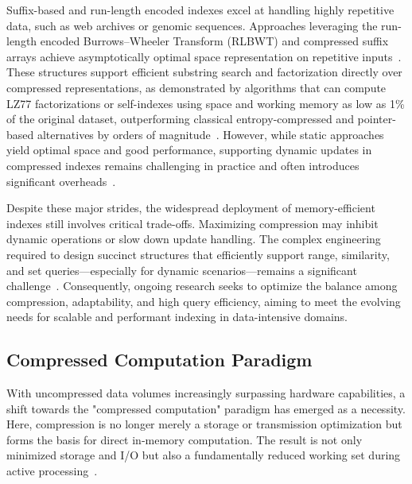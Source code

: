 \documentclass[sigconf]{acmart}
\begin{document}
Suffix-based and run-length encoded indexes excel at handling highly repetitive data, such as web archives or genomic sequences. Approaches leveraging the run-length encoded Burrows–Wheeler Transform (RLBWT) and compressed suffix arrays achieve asymptotically optimal space representation on repetitive inputs~\cite{ref80}. These structures support efficient substring search and factorization directly over compressed representations, as demonstrated by algorithms that can compute LZ77 factorizations or self-indexes using space and working memory as low as 1\% of the original dataset, outperforming classical entropy-compressed and pointer-based alternatives by orders of magnitude~\cite{ref80,ref81}. However, while static approaches yield optimal space and good performance, supporting dynamic updates in compressed indexes remains challenging in practice and often introduces significant overheads~\cite{ref80,ref108,ref118}.

Despite these major strides, the widespread deployment of memory-efficient indexes still involves critical trade-offs. Maximizing compression may inhibit dynamic operations or slow down update handling. The complex engineering required to design succinct structures that efficiently support range, similarity, and set queries—especially for dynamic scenarios—remains a significant challenge~\cite{ref109,ref118}. Consequently, ongoing research seeks to optimize the balance among compression, adaptability, and high query efficiency, aiming to meet the evolving needs for scalable and performant indexing in data-intensive domains.

\subsection{Compressed Computation Paradigm}

With uncompressed data volumes increasingly surpassing hardware capabilities, a shift towards the "compressed computation" paradigm has emerged as a necessity. Here, compression is no longer merely a storage or transmission optimization but forms the basis for direct in-memory computation. The result is not only minimized storage and I/O but also a fundamentally reduced working set during active processing~\cite{ref118}. 
\end{document}
